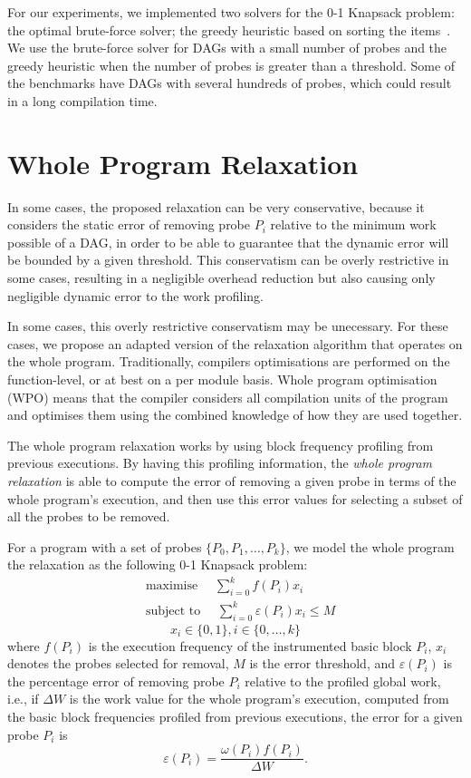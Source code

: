 For our experiments, we implemented two solvers for the 0-1 Knapsack problem:
the optimal brute-force solver;
the greedy heuristic based on sorting the items~\citep{dantzig57}.
We use the brute-force solver for DAGs with a small number of probes and the greedy heuristic when the number of probes is greater than a threshold.
Some of the benchmarks have DAGs with several hundreds of probes, which could result in a long compilation time.

\section{Whole Program Relaxation}

In some cases, the proposed relaxation can be very conservative, because it considers the static error of removing probe $P_i$ relative to the minimum work possible of a DAG, in order to be able to guarantee that the dynamic error will be bounded by a given threshold.
This conservatism can be overly restrictive in some cases, resulting in a negligible overhead reduction but also causing only negligible dynamic error to the work profiling.

In some cases, this overly restrictive conservatism may be unecessary.
For these cases, we propose an adapted version of the relaxation algorithm that operates on the whole program.
Traditionally, compilers optimisations are performed on the function-level, or at best on a per module basis.
Whole program optimisation (WPO) means that the compiler considers all compilation units of the program and optimises them using the combined knowledge of how they are used together.

The whole program relaxation works by using block frequency profiling from previous executions.
By having this profiling information, the \textit{whole program relaxation} is able to compute the error of removing a given probe in terms of the whole program's execution,
and then use this error values for selecting a subset of all the probes to be removed.

For a program with a set of probes $\{P_0, P_1, \ldots, P_k\}$, we model the whole program the relaxation as the following 0-1 Knapsack problem:
\begin{equation*}
\begin{aligned}
& \textrm{maximise }\quad \sum_{i=0}^{k} f(P_i)x_i \\
& \textrm{subject to }\quad \sum_{i=0}^{k} \varepsilon(P_i)x_i \leq M
\end{aligned}
\end{equation*}
\[
x_i\in\{0,1\}, i\in\{0,\ldots,k\}
\]
where $f(P_i)$ is the execution frequency of the instrumented basic block $P_i$, $x_i$ denotes the probes selected for removal, $M$ is the error threshold, and $\varepsilon(P_i)$ is the percentage error of removing probe $P_i$ relative to the profiled global work, i.e.,
if $\Delta W$ is the work value for the whole program's execution, computed from the basic block frequencies profiled from previous executions, the error for a given probe $P_i$ is
\[
\varepsilon(P_i) = \frac{\omega(P_i)f(P_i)}{\Delta W}.
\]

